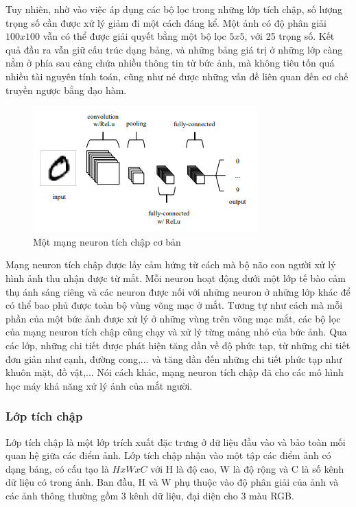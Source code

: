 Tuy nhiên, nhờ vào việc áp dụng các bộ lọc trong những lớp tích chập, số lượng trọng số cần được xử lý giảm đi một cách đáng kể. Một ảnh có độ phân giải $100x100$ vẫn có thể được giải quyết bằng một bộ lọc $5x5$, với 25 trọng số. Kết quả đầu ra vẫn giữ cấu trúc dạng bảng, và những bảng giá trị ở những lớp càng nằm ở phía sau càng chứa nhiều thông tin từ bức ảnh, mà không tiêu tốn quá nhiều tài nguyên tính toán, cũng như né được những vấn đề liên quan đến cơ chế truyền ngược bằng đạo hàm.
\begin{figure}[H]
    \centering
    \includegraphics{pics/Chapter3/conv_kernel2.png}
    \caption{Một mạng neuron tích chập cơ bản \cite{o2015introduction}}
    \label{fig:enter-label}
\end{figure}
Mạng neuron tích chập được lấy cảm hứng từ cách mà bộ não con người xử lý hình ảnh thu nhận được từ mắt.  Mỗi neuron hoạt động dưới một lớp tế bào cảm thụ ánh sáng riêng và các neuron được nối với những neuron ở những lớp khác để có thể bao phủ được toàn bộ vùng võng mạc ở mắt. Tương tự như cách mà mỗi phần của một bức ảnh được xử lý ở những vùng trên võng mạc mắt, các bộ lọc của mạng neuron tích chập cũng chạy và xử lý từng mảng nhỏ của bức ảnh. Qua các lớp, những chi tiết được phát hiện tăng dần về độ phức tạp, từ những chi tiết đơn giản như cạnh, đường cong,... và tăng dần đến những chi tiết phức tạp như khuôn mặt, đồ vật,... Nói cách khác, mạng neuron tích chập đã cho các mô hình học máy khả năng xử lý ảnh của mắt người.

\subsubsection*{Lớp tích chập}
Lớp tích chập là một lớp trích xuất đặc trưng ở dữ liệu đầu vào và bảo toàn mối quan hệ giữa các điểm ảnh. Lớp tích chập nhận vào một tập các điểm ảnh có dạng bảng, có cấu tạo là $HxWxC$ với H là độ cao, W là độ rộng và C là số kênh dữ liệu có trong ảnh. Ban đầu, H và W phụ thuộc vào độ phân giải của ảnh và các ảnh thông thường gồm 3 kênh dữ liệu, đại diện cho 3 màu RGB.


